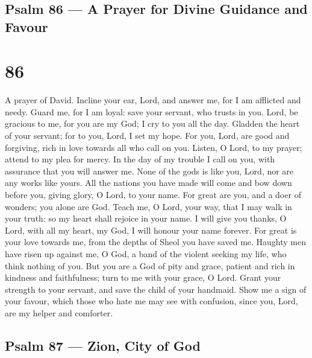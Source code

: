 \hypertarget{psalm-86-a-prayer-for-divine-guidance-and-favour}{%
\subsection{Psalm 86 --- A Prayer for Divine Guidance and
Favour}\label{psalm-86-a-prayer-for-divine-guidance-and-favour}}

\hypertarget{section-85}{%
\section{86}\label{section-85}}

A prayer of David.  Incline your ear, Lord, and answer me,
for I am afflicted and needy.  Guard me, for I am loyal:
save your servant, who trusts in you.  Lord, be gracious to
me, for you are my God; I cry to you all the day.  Gladden
the heart of your servant; for to you, Lord, I set my hope. 
For you, Lord, are good and forgiving, rich in love towards all who call
on you.  Listen, O Lord, to my prayer; attend to my plea for
mercy.  In the day of my trouble I call on you, with
assurance that you will answer me.  None of the gods is like
you, Lord, nor are any works like yours.  All the nations
you have made will come and bow down before you, giving glory, O Lord,
to your name.  For great are you, and a doer of wonders;
you alone are God.  Teach me, O Lord, your way, that I may
walk in your truth: so my heart shall rejoice in your name.
 I will give you thanks, O Lord, with all my heart, my God,
I will honour your name forever.  For great is your love
towards me, from the depths of Sheol you have saved me. 
Haughty men have risen up against me, O God, a band of the violent
seeking my life, who think nothing of you.  But you are a
God of pity and grace, patient and rich in kindness and faithfulness;
turn to me with your grace, O Lord.  Grant your strength to
your servant, and save the child of your handmaid.  Show me
a sign of your favour, which those who hate me may see with confusion,
since you, Lord, are my helper and comforter.

\hypertarget{psalm-87-zion-city-of-god}{%
\subsection{Psalm 87 --- Zion, City of
God}\label{psalm-87-zion-city-of-god}}

